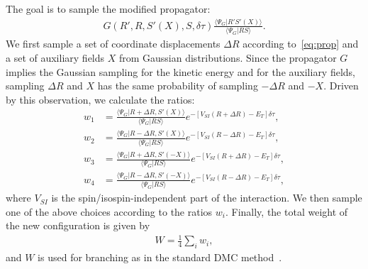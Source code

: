 \documentclass[aps,prc,twocolumn,superscriptaddress,floatfix]{revtex4-1}
\begin{document}
The goal is to sample the modified propagator:
\begin{align}
G(R',R,S'(X),S,\delta\tau)\frac{\langle\Psi_G|R'S'(X)\rangle}{\langle\Psi_G|RS\rangle} .
\end{align}
We first sample a set of coordinate displacements $\Delta R$ according
to~\cref{eq:prop} and a
set of auxiliary fields $X$ from Gaussian distributions.
Since the propagator $G$ implies the Gaussian sampling for the kinetic energy and 
for the auxiliary fields, sampling $\Delta R$ and $X$ has the same probability
of sampling $-\Delta R$ and $-X$.
Driven by this observation, we calculate the ratios:
\begin{align}
w_1&=\frac{\langle\Psi_G|R+\Delta R,S'(X)\rangle}{\langle\Psi_G|RS\rangle}e^{-[V_{SI}(R+\Delta R)-E_T]\delta\tau},
\nonumber \\
w_2&=\frac{\langle\Psi_G|R-\Delta R,S'(X)\rangle}{\langle\Psi_G|RS\rangle}e^{-[V_{SI}(R-\Delta R)-E_T]\delta\tau},
\nonumber \\
w_3&=\frac{\langle\Psi_G|R+\Delta R,S'(-X)\rangle}{\langle\Psi_G|RS\rangle}e^{-[V_{SI}(R+\Delta R)-E_T]\delta\tau},
\nonumber \\
w_4&=\frac{\langle\Psi_G|R-\Delta R,S'(-X)\rangle}{\langle\Psi_G|RS\rangle}e^{-[V_{SI}(R-\Delta R)-E_T]\delta\tau},
\label{eq:w_i}
\end{align}
where $V_{SI}$ is the spin/isospin-independent part of the interaction.
We then sample one of the above choices according to the ratios $w_i$.
Finally, the total weight of the new configuration is given by
\begin{align}
W=\frac{1}{4}\sum_i w_i ,
\end{align}
and $W$ is used for branching as in the standard DMC method~\cite{Carlson:2015}.
\end{document}
